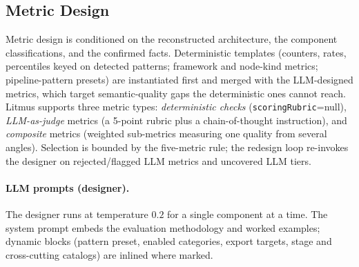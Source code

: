 \documentclass[11pt]{article}
\begin{document}
\subsection{Metric Design}
\label{app:impl-metric}

Metric design is conditioned on the reconstructed architecture, the component classifications, and the confirmed facts. Deterministic templates (counters, rates, percentiles keyed on detected patterns; framework and node-kind metrics; pipeline-pattern presets) are instantiated first and merged with the LLM-designed metrics, which target semantic-quality gaps the deterministic ones cannot reach. Litmus supports three metric types: \emph{deterministic checks} (\texttt{scoringRubric}=null), \emph{LLM-as-judge} metrics (a 5-point rubric plus a chain-of-thought instruction), and \emph{composite} metrics (weighted sub-metrics measuring one quality from several angles). Selection is bounded by the five-metric rule; the redesign loop re-invokes the designer on rejected/flagged LLM metrics and uncovered LLM tiers.

\paragraph{LLM prompts (designer).} The designer runs at temperature $0.2$ for a single component at a time. The system prompt embeds the evaluation methodology and worked examples; dynamic blocks (pattern preset, enabled categories, export targets, stage and cross-cutting catalogs) are inlined where marked.
\end{document}
